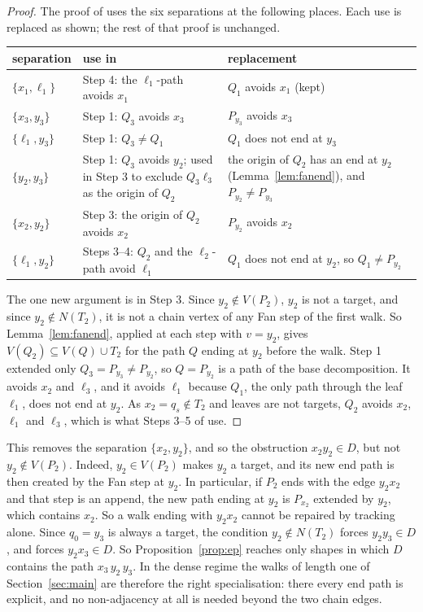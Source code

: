 \documentclass[11pt]{amsart}
\theoremstyle{definition}
\begin{document}
\begin{proof}
The proof of \cite[Thm~8.2]{TM} uses the six separations at the following places. Each use is
replaced as shown; the rest of that proof is unchanged.
\begin{center}\footnotesize
\begin{tabular}{@{}lp{}p{}@{}}
\toprule
separation & use in \cite[Thm~8.2]{TM} & replacement\\
\midrule
$\{x_1,\ell_1\}$ & Step 4: the $\ell_1$-path avoids $x_1$ & $Q_1$ avoids $x_1$ (kept)\\
$\{x_3,y_3\}$ & Step 1: $Q_3$ avoids $x_3$ & $P_{y_3}$ avoids $x_3$\\
$\{\ell_1,y_3\}$ & Step 1: $Q_3\ne Q_1$ & $Q_1$ does not end at $y_3$\\
$\{y_2,y_3\}$ & Step 1: $Q_3$ avoids $y_2$; used in Step 3 to exclude $Q_3\ell_3$ as the origin of
$Q_2$ & the origin of $Q_2$ has an end at $y_2$ (Lemma~\ref{lem:fanend}), and
$P_{y_2}\ne P_{y_3}$\\
$\{x_2,y_2\}$ & Step 3: the origin of $Q_2$ avoids $x_2$ & $P_{y_2}$ avoids $x_2$\\
$\{\ell_1,y_2\}$ & Steps 3--4: $Q_2$ and the $\ell_2$-path avoid $\ell_1$ & $Q_1$ does not end at
$y_2$, so $Q_1\ne P_{y_2}$\\
\bottomrule
\end{tabular}
\end{center}
The one new argument is in Step 3. Since $y_2\notin V(P_2)$, $y_2$ is not a target, and since
$y_2\notin N(T_2)$, it is not a chain vertex of any Fan step of the first walk. So
Lemma~\ref{lem:fanend}, applied at each step with $v=y_2$, gives $V(Q_2)\subseteq V(Q)\cup T_2$
for the path $Q$ ending at $y_2$ before the walk. Step 1 extended only $Q_3=P_{y_3}\ne P_{y_2}$,
so $Q=P_{y_2}$ is a path of the base decomposition. It avoids $x_2$ and $\ell_3$, and it avoids
$\ell_1$ because $Q_1$, the only path through the leaf $\ell_1$, does not end at $y_2$. As
$x_2=q_s\notin T_2$ and leaves are not targets, $Q_2$ avoids $x_2$, $\ell_1$ and $\ell_3$, which is
what Steps 3--5 of \cite[Thm~8.2]{TM} use.
\end{proof}

This removes the separation $\{x_2,y_2\}$, and so the obstruction $x_2y_2\in D$, but not
$y_2\notin V(P_2)$. Indeed, $y_2\in V(P_2)$ makes $y_2$ a target, and its new end path is then
created by the Fan step at $y_2$. In particular, if $P_2$ ends with the edge $y_2x_2$ and that
step is an append, the new path ending at $y_2$ is $P_{x_2}$ extended by $y_2$, which contains
$x_2$. So a walk ending with $y_2x_2$ cannot be repaired by tracking alone. Since $q_0=y_3$
is always a target, the condition $y_2\notin N(T_2)$ forces $y_2y_3\in D$, and
\cite[Def.~8.1(ii)]{TM} forces $y_2x_3\in D$. So Proposition~\ref{prop:ep} reaches only shapes in
which $D$ contains the path $x_3\,y_2\,y_3$. In the dense regime
the walks of length one of Section~\ref{sec:main} are therefore the right specialisation: there
every end path is explicit, and no non-adjacency at all is needed beyond the two chain edges.
\end{document}
